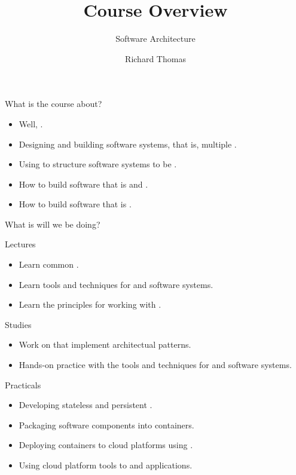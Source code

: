 \documentclass{slide}
\title{Course Overview}
\subtitle{Software Architecture}
\institute{University of Queensland}
\author{Richard Thomas}
\date{\week{1}}
\begin{document}
\maketitle

\begin{frame}{What is the course about?}
\begin{itemize}[<+->]
    \item Well, .
    \item Designing and building software systems, that is, multiple .
    \item Using  to structure software systems to be .
    \item How to build software that is  and .
    \item How to build software that is .
\end{itemize}
\end{frame}


\begin{frame}{What is will we be doing?}

{\color{pine} Lectures}
\begin{itemize}[<+->]
    \item Learn common .
    \item Learn tools and techniques for  and  software systems.
    \item Learn the principles for working with .
\end{itemize}

{\color{pine} Studies}
\begin{itemize}[<+->]
    \item Work on  that implement architectual patterns.
    \item Hands-on practice with the tools and techniques for  and  software systems.
\end{itemize}

{\color{pine} Practicals}
\begin{itemize}[<+->]
    \item Developing stateless and persistent .
    \item Packaging software components into  containers.
    \item Deploying containers to cloud platforms using .
    \item Using cloud platform tools to  and  applications.
\end{itemize}

\end{frame}
\end{document}

